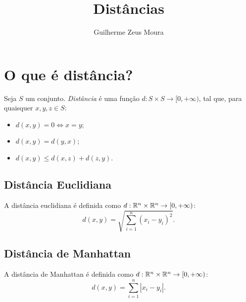 \documentclass[10pt, a4paper]{article}
\title{Distâncias}
\author{Guilherme Zeus Moura}
\begin{document}
	
	\zeustitle
	\section{O que é distância?}
	\begin{defn}
		Seja $S$ um conjunto. \emph{Distância} é uma função $d: S \times S \to [0, +\infty)$, tal que, para quaisquer $x, y, z \in S$:
		\begin{itemize}
			\item $d(x, y) = 0 \iff x = y$;
			\item $d(x, y) = d(y, x)$;
			\item $d(x, y) \le d(x, z) + d(z, y)$.
		\end{itemize} 
	\end{defn}
	\subsection{Distância Euclidiana}
	\begin{defn}
		A distância euclidiana é definida como $d: \mathbb{R}^n \times \mathbb{R}^n \to [0, +\infty)$:
		$$d(x, y) = \sqrt{ \sum_{i=1}^n (x_i - y_i)^2 }.$$
	\end{defn}
	\subsection{Distância de Manhattan}
	\begin{defn}
		A distância de Manhattan é definida como $d: \mathbb{R}^n \times \mathbb{R}^n \to [0, +\infty)$:
		$$d(x, y) = \sum_{i=1}^n |x_i - y_i| .$$
	\end{defn}
\end{document}
